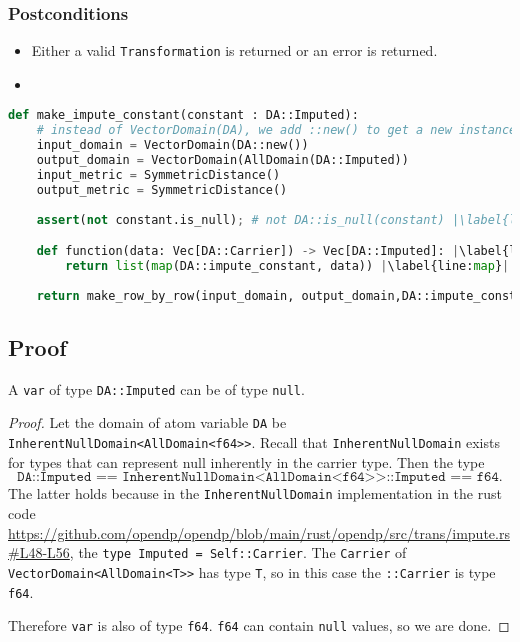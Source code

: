 \subsubsection*{Postconditions}

\begin{itemize}
    \item Either a valid \texttt{Transformation} is returned or an error is returned.
    \item {}
\end{itemize}


\begin{lstlisting}[language=Python,  escapechar=|]
def make_impute_constant(constant : DA::Imputed):
    # instead of VectorDomain(DA), we add ::new() to get a new instance of DA. This is because DA has the ImputableDomain trait.
    input_domain = VectorDomain(DA::new())
    output_domain = VectorDomain(AllDomain(DA::Imputed))
    input_metric = SymmetricDistance()
    output_metric = SymmetricDistance()
    
    assert(not constant.is_null); # not DA::is_null(constant) |\label{line:null}|

    def function(data: Vec[DA::Carrier]) -> Vec[DA::Imputed]: |\label{line:fn}|
        return list(map(DA::impute_constant, data)) |\label{line:map}|
        
    return make_row_by_row(input_domain, output_domain,DA::impute_constant) |\label{line:row-transform}|
\end{lstlisting}

\subsection{Proof}

\begin{lemma} \label{lemma:Imputed}
A \texttt{var} of type \texttt{DA::Imputed} can be of type \texttt{null}.
\end{lemma}
\begin{proof}
Let the domain of atom variable \texttt{DA} be \texttt{InherentNullDomain<AllDomain<f64>>}. Recall that \texttt{InherentNullDomain} exists for types that can represent null inherently in the carrier type. Then the type $$\texttt{DA::Imputed == InherentNullDomain<AllDomain<f64>>::Imputed == f64}.$$ The latter holds because in the \texttt{InherentNullDomain} implementation in the rust code \url{https://github.com/opendp/opendp/blob/main/rust/opendp/src/trans/impute.rs#L48-L56}, the \texttt{type Imputed = Self::Carrier}. The \texttt{Carrier} of \texttt{VectorDomain<AllDomain<T>>} has type \texttt{T}, so in this case the \texttt{::Carrier} is type \texttt{f64}.

Therefore \texttt{var} is also of type \texttt{f64}. \texttt{f64} can contain \texttt{null} values, so we are done.
\end{proof}

